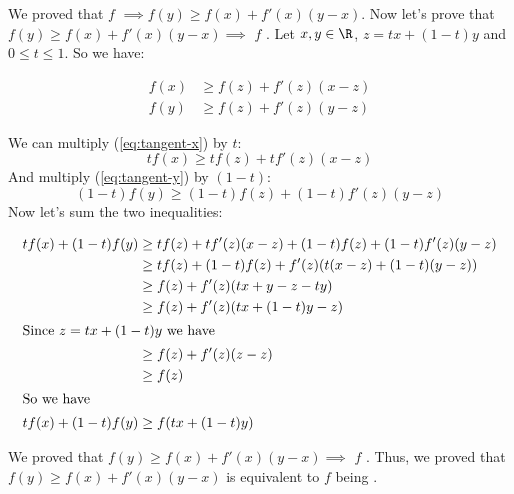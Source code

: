 \begin{enumerate}
\begin{ceqn}
    \end{ceqn}
    We proved that $f$ \cvx{} $\implies f(y) \geq f(x) + f'(x)(y-x)$. Now let's prove that $f(y) \geq f(x) + f'(x)(y-x) \implies$ $f$  \cvx.
    Let $x,y \in \R$, $z=tx+(1-t)y$ and $0 \leq t \leq 1$. So we have:
    \begin{ceqn}
        \begin{align}
            f(x) &\geq f(z) + f'(z)(x-z) \label{eq:tangent-x}\\
            f(y) &\geq f(z) + f'(z)(y-z) \label{eq:tangent-y}
        \end{align}
    \end{ceqn}
    We can multiply (\ref{eq:tangent-x}) by $t$:
    $$tf(x) \geq tf(z) + tf'(z)(x-z)$$
    And multiply (\ref{eq:tangent-y}) by $(1-t)$:
    $$(1-t)f(y) \geq (1-t)f(z) + (1-t)f'(z)(y-z) $$
    Now let's sum the two inequalities:
    \begin{ceqn}
        \begin{align*}
            tf(x) + (1-t)f(y) &\geq tf(z) + tf'(z)(x-z) + (1-t)f(z) + (1-t)f'(z)(y-z) \\
            &\geq  tf(z) + (1-t)f(z) + f'(z)(t(x-z) + (1-t)(y-z)) \\
            &\geq  f(z) + f'(z)(tx + y -z -ty) \\
            &\geq  f(z) + f'(z)(tx + (1-t)y -z) \\
            \intertext{Since $z=tx+(1-t)y$ we have}
            &\geq  f(z) + f'(z)(z-z) \\
            &\geq  f(z) \\
            \intertext{So we have}
            tf(x) + (1-t)f(y) &\geq f(tx + (1-t)y)
        \end{align*}
    \end{ceqn}
    We proved that $f(y) \geq f(x) + f'(x)(y-x) \implies$ $f$  \cvx{}. Thus, we proved that $f(y) \geq f(x) + f'(x)(y-x)$ is equivalent to $f$ being \cvx{}.


\end{enumerate}
